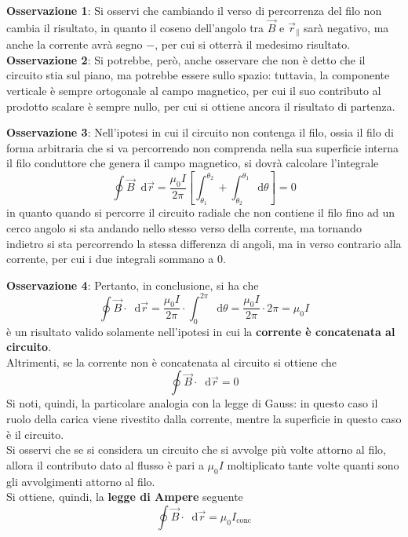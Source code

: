 \documentclass[a4paper]{extarticle}
\newcommand\dif{\mathop{}\!\mathrm{d}}
\begin{document}
\vspace{1em}
\noindent
\textbf{Osservazione 1}: Si osservi che cambiando il verso di percorrenza del filo non cambia il risultato, in quanto il coseno dell'angolo tra $\vec B$ e $\vec r_\parallel$ sarà negativo, ma anche la corrente avrà segno $-$, per cui si otterrà il medesimo risultato.\\

\vspace{1em}
\noindent
\textbf{Osservazione 2}: Si potrebbe, però, anche osservare che non è detto che il circuito stia sul piano, ma potrebbe essere sullo spazio: tuttavia, la componente verticale è sempre ortogonale al campo magnetico, per cui il suo contributo al prodotto scalare è sempre nullo, per cui si ottiene ancora il risultato di partenza.

\vspace{1em}
\noindent
\textbf{Osservazione 3}: Nell'ipotesi in cui il circuito non contenga il filo, ossia il filo di forma arbitraria che si va percorrendo non comprenda nella sua superficie interna il filo conduttore che genera il campo magnetico, si dovrà calcolare l'integrale
\[\oint \vec B \dif \vec r = \frac{\mu_0 I}{2 \pi} \left[\int_{\theta_1}^{\theta_2} + \int_{\theta_2}^{\theta_1} \dif \theta\right] = 0\]
in quanto quando si percorre il circuito radiale che non contiene il filo fino ad un cerco angolo si sta andando nello stesso verso della corrente, ma tornando indietro si sta percorrendo la stessa differenza di angoli, ma in verso contrario alla corrente, per cui i due integrali sommano a $0$.

\vspace{1em}
\noindent
\textbf{Osservazione 4}: Pertanto, in conclusione, si ha che 
\[\oint \vec B \cdot \dif \vec r = \dfrac{\mu_0 I}{2 \pi} \cdot \int_0^{2\pi} \dif \theta = \frac{\mu_0 I}{2 \pi} \cdot 2\pi = \mu_0 I\]
è un risultato valido solamente nell'ipotesi in cui la \textbf{corrente è concatenata al circuito}.\\
Altrimenti, se la corrente non è concatenata al circuito si ottiene che
\[\oint \vec B \cdot \dif \vec r = 0\]
Si noti, quindi, la particolare analogia con la legge di Gauss: in questo caso il ruolo della carica viene rivestito dalla corrente, mentre la superficie in questo caso è il circuito.\\
Si osservi che se si considera un circuito che si avvolge più volte attorno al filo, allora il contributo dato al flusso è pari a $\mu_0 I$ moltiplicato tante volte quanti sono gli avvolgimenti attorno al filo.\\
Si ottiene, quindi, la \textbf{legge di Ampere} seguente
\[\boxed{\oint \vec B \cdot \dif \vec r = \mu_0 I_\text{conc}}\]
\end{document}
